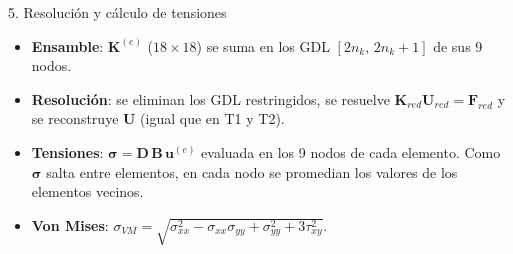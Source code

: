 \begin{desarrollo}{5. Resoluci\'on y c\'alculo de tensiones}

\begin{itemize}[itemsep=2pt]
  \item \textbf{Ensamble}: $\mathbf{K}^{(e)}$ ($18\times18$) se suma en los GDL
  $[2n_k,\,2n_k+1]$ de sus 9 nodos.
  \item \textbf{Resoluci\'on}: se eliminan los GDL restringidos, se resuelve
  $\mathbf{K}_{red}\mathbf{U}_{red}=\mathbf{F}_{red}$ y se reconstruye $\mathbf{U}$
  (igual que en T1 y T2).
  \item \textbf{Tensiones}: $\bm\sigma=\mathbf{D}\,\mathbf{B}\,\mathbf{u}^{(e)}$
  evaluada en los 9 nodos de cada elemento. Como $\bm\sigma$ salta entre
  elementos, en cada nodo se promedian los valores de los elementos vecinos.
  \item \textbf{Von Mises}:
  $\sigma_{VM}=\sqrt{\sigma_{xx}^2-\sigma_{xx}\sigma_{yy}+\sigma_{yy}^2+3\tau_{xy}^2}$.
\end{itemize}
\end{desarrollo}


